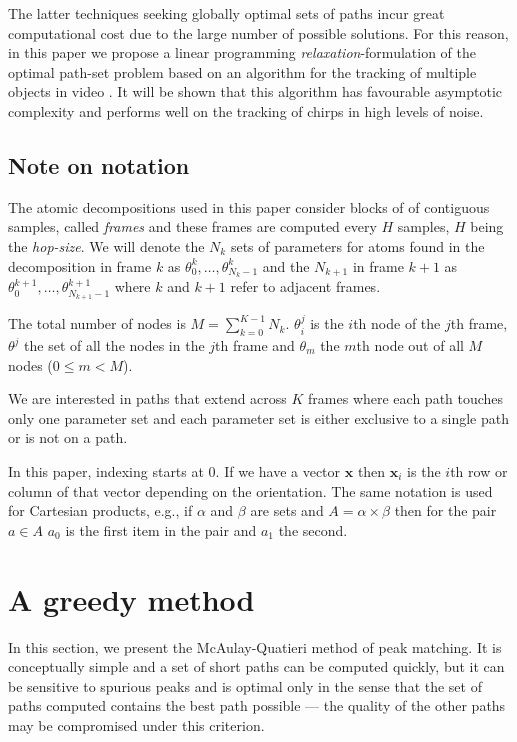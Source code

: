 \documentclass{article}
\newcommand{\BS}[1]{\boldsymbol{#1}}
\begin{document}
\begin{sloppy}
The latter techniques seeking globally optimal sets of paths incur great
computational cost due to the large number of possible solutions. For this reason, in
this paper we propose a linear programming \textit{relaxation}-formulation of
the optimal path-set problem based on
an algorithm for the tracking of multiple objects in video
\cite{jiang2007linear}. It will be shown that this algorithm has favourable
asymptotic complexity and performs well on the tracking of chirps in high levels
of noise.

\subsection{Note on notation}

The atomic decompositions used in this paper consider blocks of 
of contiguous samples, called \textit{frames} and these frames are
computed every $H$ samples, $H$ being the \textit{hop-size}. We will denote the
$N_{k}$ sets of parameters for atoms found in the decomposition in frame $k$ as $\theta_0^{k},
\dotsc, \theta_{N_{k}-1}^{k}$ and the $N_{k+1}$ in frame $k+1$ as
$\theta_0^{k+1}, \dotsc, \theta_{N_{k+1}-1}^{k+1}$ where $k$ and $k+1$ refer to
adjacent frames.

The total number of nodes is $M = \sum_{k=0}^{K-1} N_{k}$. $\theta_{i}^{j}$ is the
$i$th node of the $j$th frame, $\theta^{j}$ the set of all the nodes in the
$j$th frame and $\theta_{m}$ the $m$th node out of all $M$ nodes ($0 \leq m <
M$).

We are interested in paths that extend across $K$ frames where
each path touches only one parameter set and each parameter set is either
exclusive to a single path or is not on a path.

In this paper, indexing starts at 0. If we have a vector $\BS{x}$ then
$\BS{x}_{i}$ is the $i$th row or column of that vector depending on the
orientation. The same notation is used for Cartesian products, e.g., if $\alpha$
and $\beta$ are sets and $A =
\alpha \times \beta$ then for the pair $a \in A$ $a_{0}$ is the first item in
the pair and $a_{1}$ the second.

\section{A greedy method}

In this section, we present the McAulay-Quatieri method of peak matching. It is
conceptually simple and a set of short paths can be computed quickly, but
it can be sensitive to spurious peaks and is optimal only in the sense that
the set of paths computed contains the best path possible --- the quality of the
other paths may be compromised under this criterion.


\end{sloppy}
\end{document}
